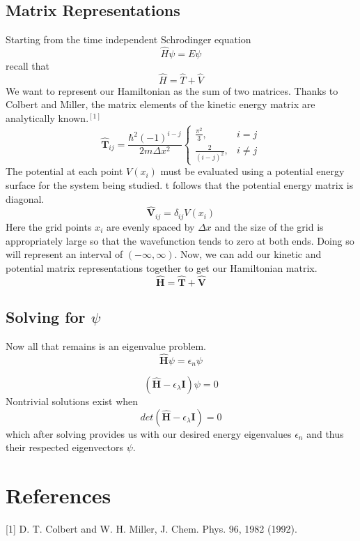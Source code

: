 \documentclass[12pt]{article}
\begin{document}
\subsection{Matrix Representations}
Starting from the time independent Schrodinger equation
\begin{equation}
\hat{H}\psi = E\psi
\end{equation}
recall that
\begin{equation}
\hat{H}=\hat{T}+\hat{V}
\end{equation}
We want to represent our Hamiltonian as the sum of two matrices.
Thanks to Colbert and Miller, the matrix elements of the kinetic energy matrix are analytically known.$^{[1]}$
\begin{equation}
\hat{\textbf{T}}_{ij} = \frac{\hbar^2(-1)^{i-j}}{2m\Delta{x^2}}
\begin{cases}
\frac{\pi^2}{3}, &i=j\\
\frac{2}{(i-j)^2}, &i\neq{j}
\end{cases}
\end{equation}
The potential at each point $V(x_i)$ must be evaluated using a potential energy surface for the system being studied. 
t follows that the potential energy matrix is diagonal.
\begin{equation}
\hat{\textbf{V}}_{ij}=\delta_{ij}V(x_i)
\end{equation}
Here the grid points $x_i$ are evenly spaced by $\Delta{x}$ and the size of the grid is appropriately large so that the wavefunction tends to zero at both ends.
Doing so will represent an interval of $(-\infty, \infty)$.
Now, we can add our kinetic and potential matrix representations together to get our Hamiltonian matrix.
\begin{equation}
\hat{\textbf{H}}=\hat{\textbf{T}}+\hat{\textbf{V}}
\end{equation}

\subsection{Solving for $\psi$}
Now all that remains is an eigenvalue problem.
\begin{equation}
\hat{\textbf{H}}\psi=\epsilon_n\psi
\end{equation}

\begin{equation}
(\hat{\textbf{H}}-\epsilon_\lambda\textbf{I})\psi=0
\end{equation}
Nontrivial solutions exist when 
\begin{equation}
det(\hat{\textbf{H}}-\epsilon_\lambda\textbf{I})=0
\end{equation}
which after solving provides us with our desired energy eigenvalues $\epsilon_n$ and thus their respected eigenvectors $\psi$.

\section{References}
[1] D. T. Colbert and W. H. Miller, J. Chem. Phys. 96, 1982 (1992).
\end{document}

